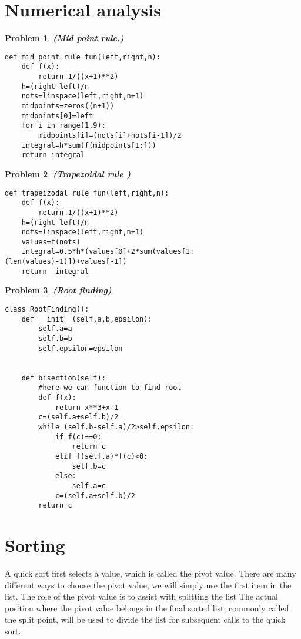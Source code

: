 \documentclass{book}
\newtheorem{problem}{Problem}[section]
\begin{document}
\section{Numerical analysis}

\begin{problem}\textbf{ (Mid point rule.)}
\begin{verbatim}
def mid_point_rule_fun(left,right,n):
    def f(x):
        return 1/((x+1)**2)
    h=(right-left)/n
    nots=linspace(left,right,n+1)
    midpoints=zeros((n+1))
    midpoints[0]=left
    for i in range(1,9):
        midpoints[i]=(nots[i]+nots[i-1])/2
    integral=h*sum(f(midpoints[1:]))
    return integral
\end{verbatim}
\end{problem}

\begin{problem}\textbf{(Trapezoidal rule )}
\begin{verbatim}
def trapeizodal_rule_fun(left,right,n):
    def f(x):
        return 1/((x+1)**2)
    h=(right-left)/n
    nots=linspace(left,right,n+1)
    values=f(nots)
    integral=0.5*h*(values[0]+2*sum(values[1:(len(values)-1)])+values[-1])
    return  integral
\end{verbatim}
\end{problem}

\begin{problem}\textbf{(Root finding)}
\begin{verbatim}
class RootFinding():
    def __init__(self,a,b,epsilon):
        self.a=a
        self.b=b
        self.epsilon=epsilon


    def bisection(self):
        #here we can function to find root
        def f(x):
            return x**3+x-1
        c=(self.a+self.b)/2
        while (self.b-self.a)/2>self.epsilon:
            if f(c)==0:
                return c
            elif f(self.a)*f(c)<0:
                self.b=c
            else:
                self.a=c
            c=(self.a+self.b)/2
        return c
\end{verbatim}
\end{problem}
\section{Sorting}
A quick sort first selects a value, which is called the pivot value. There are many different ways to choose the pivot value, we will simply use the first item in the list. The role of the pivot value is to assist with splitting the list The actual position where the pivot value belongs in the final sorted list, commonly called the split point, will be used to divide the list for subsequent calls to the quick sort.
\end{document}
